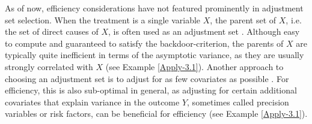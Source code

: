 \documentclass[11pt,a4paper]{article}
\theoremstyle{definition}
\theoremstyle{remark}
\newcommand{\g}[1][G]{\mathcal{#1}}
\begin{document}
%
%
%
%
%

As of now, efficiency considerations have not featured prominently in adjustment set selection.
When the treatment is a single variable $X$, the parent set of $X$, i.e. the set of direct causes of $X$, is often used as an adjustment set  \citep[e.g.,][]{williamson2014introduction,gascon2015prenatal,sunyer2015association}.
Although easy to compute and guaranteed to satisfy the backdoor-criterion, the parents of $X$ are typically quite inefficient in terms of the asymptotic variance, as they are usually strongly correlated with $X$ (see Example \ref{Apply-3.1}). 
Another approach to choosing an adjustment set is to adjust for as few covariates as possible \citep[e.g.,][]{de2011covariate,jonker2012iron,schliep2015effect}. For efficiency, this is also sub-optimal in general, as adjusting for certain additional covariates that explain variance in the outcome $Y$, sometimes called precision variables or risk factors, can be beneficial for efficiency (see Example \ref{Apply-3.1}). 
\end{document}
